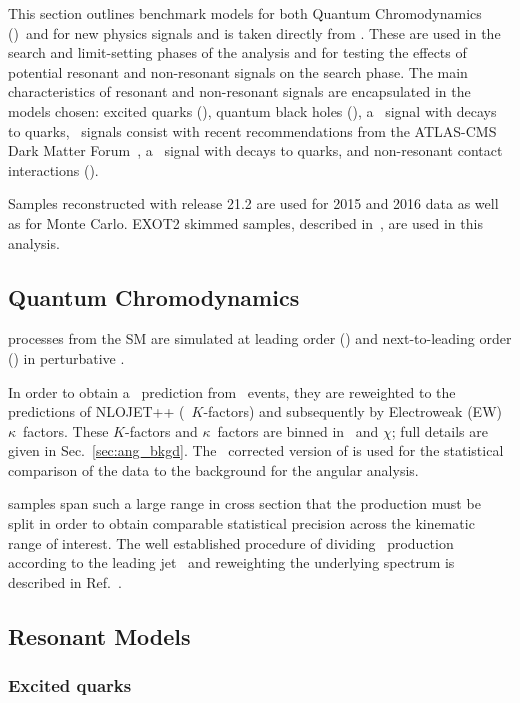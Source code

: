 This section outlines benchmark models for both Quantum Chromodynamics (\QCD)~and for new
physics signals and is taken directly from \cite{Bauce:2226443}. These are used in the search and limit-setting phases of the
analysis and for testing the effects of potential
resonant and non-resonant signals on the search phase.
The main characteristics of resonant and non-resonant
signals are encapsulated in the models chosen:
excited quarks (\qstar{}), quantum black holes (\QBH), 
a \Wprime\ signal with decays to quarks,
\Zprime\ signals consist with recent recommendations from the 
ATLAS-CMS Dark Matter Forum~\cite{Abercrombie:2015wmb},
a \Wstar\ signal with decays to quarks,
and non-resonant contact interactions (\CI).

Samples reconstructed with release 21.2 are used for 2015 and 2016 data as well as for Monte Carlo. EXOT2 skimmed samples, described in~\cite{ATLAS:Exot2Derivation}, are used in this analysis.

\subsection{Quantum Chromodynamics}
\label{qcdsamps}
\QCD processes from the SM are simulated at leading order (\LO)
and next-to-leading order (\NLO) in perturbative \QCD. 

In order to obtain a \NLO~prediction from \Pythia~events, they are reweighted to the 
predictions of NLOJET++ (\NLO~$K$-factors) and subsequently by Electroweak (EW) $\kappa$~factors. 
These $K$-factors and $\kappa$~factors are binned in \mjj\ and $\chi$; full details are given in Sec.~\ref{sec:ang_bkgd}.  The \NLO\ corrected
version of  is used for the statistical comparison of the 
data to the background for the angular analysis.

\QCD samples span such a large range in cross section that the
production must be split in order to obtain comparable statistical precision
across the kinematic range of interest.
The well established procedure of dividing \QCD~production according
to the leading jet \pT~and reweighting the underlying spectrum
is described in Ref.~\cite{Marshall:2016630}.  

\subsection{Resonant Models}
\subsubsection{Excited quarks}
\label{sec:qstar}

